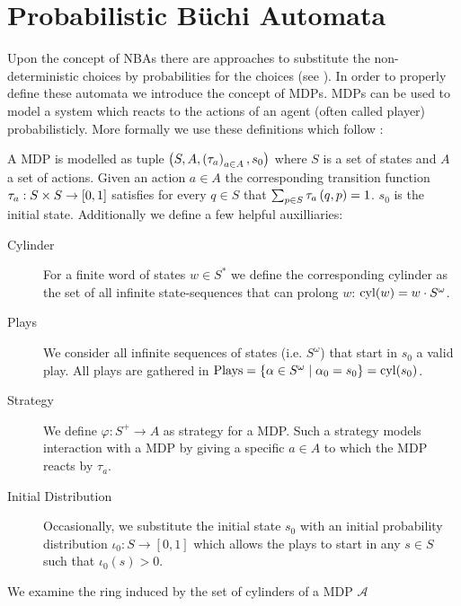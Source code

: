 \section{Probabilistic Büchi Automata}
Upon the concept of \acp{NBA} there are approaches to substitute the
non-deterministic choices by probabilities for the choices
(see \cite{RecOmeLangProbAuto,DecProblemsForProbAuto,Groesser}). In order to
properly define these automata we introduce the concept of \aclp{MDP}.
\aclp*{MDP} can be used to model a system which reacts to the actions of an
agent (often called player) probabilisticly.
More formally we use these definitions which follow \cite{RandAutoInfTrees}:
\begin{definition}
  A \acl*{MDP} is modelled as tuple
  $\left(S, A, \left(\tau_{a}\right)_{a\in A}, s_{0}\right)$ where $S$ is a set of states
  and $A$ a set of actions. Given an action $a\in A$ the corresponding
  transition function $\tau_{a}:S\times S\rightarrow \left[0,1\right]$ satisfies
  for every $q\in S$ that $\sum_{p\in S}\tau_{a}\left(q,p\right) = 1$.
  $s_{0}$ is the initial state. Additionally we define a few helpful
  auxilliaries:
  \begin{description}
    \item [Cylinder] For a finite word of states $w\in S^{*}$ we define the
      corresponding cylinder as the set of all infinite state-sequences
      that can prolong $w$: $\operatorname{cyl}(w) = w\cdot S^{\omega}$.
    \item [Plays] We consider all infinite sequences of states
      (i.e. $S^{\omega}$) that start in $s_{0}$ a valid play. All plays
      are gathered in $\operatorname{Plays} = \left\{
        \alpha\in S^{\omega}\mid \alpha_{0} = s_{0}\right\} = \operatorname{cyl}(s_{0})$.
    \item [Strategy] We define $\varphi:S^{+}\rightarrow A$ as strategy for
      a \ac{MDP}. Such a strategy models interaction with a \ac{MDP} by
      giving a specific $a\in A$ to which the \ac{MDP} reacts by $\tau_{a}$.
    \item [Initial Distribution] Occasionally, we substitute the initial state
      $s_{0}$ with an initial probability distribution
      $\iota_{0}:S\rightarrow[0,1]$ which allows the plays to start in any
      $s\in S$ such that $\iota_{0}(s) > 0$.
  \end{description}
  \label{def:mdp}
\end{definition}
We examine the ring induced by the set of cylinders of a \ac{MDP} $\mathcal{A}$
